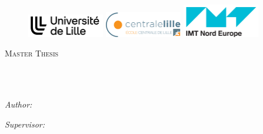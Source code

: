 \documentclass[
11pt, %
english, %
singlespacing, %
headsepline, %
]{MastersDoctoralThesis} %
\author{Aymeric \textsc{Côme}} %
\begin{document}
\frontmatter %

\pagestyle{plain} %


\begin{titlepage}
\begin{center}

\vspace*{.00\textheight}
        {\scshape\large \univname\par}\vspace{0.4cm} %
        \begin{figure}
          \centering
          \includegraphics[width=0.3\textwidth]{ulille_logo_noir.png}
          \includegraphics[width=0.3\textwidth]{Centrale_Lille.png} %
          \includegraphics[width=0.3\textwidth]{IMT_Lille_douai_Logo_WEB.png}
        \end{figure}

\textsc{\Large Master Thesis}\\[0.5cm] %

\HRule \\[0.4cm] %
{\huge \bfseries \ttitle\par}\vspace{0.4cm} %
\HRule \\[1.5cm] %
 
\begin{minipage}[t]{0.4\textwidth}
\begin{flushleft} \large
\emph{Author:}\\
\authorname %
\end{flushleft}
\end{minipage}
\begin{minipage}[t]{0.4\textwidth}
\begin{flushright} \large
\emph{Supervisor:} \\
\href{https://sites.google.com/view/talebi/}{\supname} %
\end{flushright}
\end{minipage}\\[2cm]
 

\end{center}
\end{titlepage}
\end{document}
